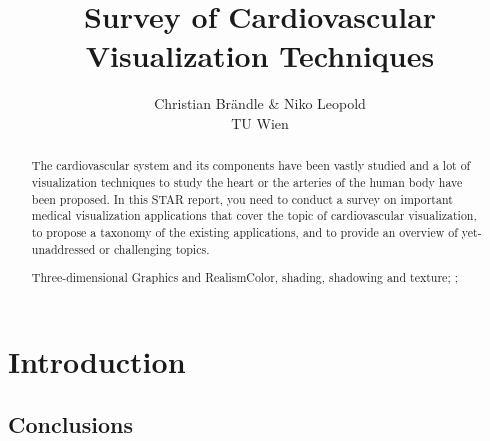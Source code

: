 \documentclass{egpubl}
\title{Survey of Cardiovascular Visualization Techniques}
\author{Christian Brändle \& Niko Leopold
		\\
	TU Wien}
\begin{document}
\maketitle


\begin{abstract}
	The cardiovascular system and its components have been vastly studied and a lot 
	of visualization techniques to study the heart or the arteries of the human body 
	have  been  proposed.  In  this  STAR  report,  you  need  to  conduct  a  survey  on 
	important  medical  visualization  applications  that  cover  the  topic  of 
	cardiovascular visualization, to propose a taxonomy of the existing applications, 
	and to provide an overview of yet-unaddressed or challenging topics.  
		
	\begin{classification} %
		 {Three-dimensional Graphics and Realism}{Color, shading, shadowing and texture};
		;
	\end{classification}
	
\end{abstract}

\section{Introduction}

%


\subsection{Conclusions}

%

%


\end{document}
